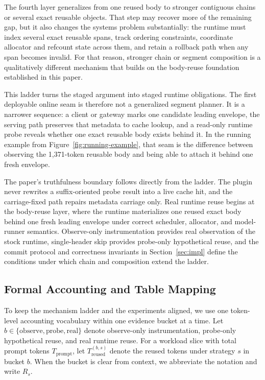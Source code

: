 \documentclass[conference]{IEEEtran}
\begin{document}
The fourth layer generalizes from one reused body to stronger contiguous chains or several exact reusable objects. That step may recover more of the remaining gap, but it also changes the systems problem substantially: the runtime must index several exact reusable spans, track ordering constraints, coordinate allocator and refcount state across them, and retain a rollback path when any span becomes invalid. For that reason, stronger chain or segment composition is a qualitatively different mechanism that builds on the body-reuse foundation established in this paper.

This ladder turns the staged argument into staged runtime obligations. The first deployable online seam is therefore not a generalized segment planner. It is a narrower sequence: a client or gateway marks one candidate leading envelope, the serving path preserves that metadata to cache lookup, and a read-only runtime probe reveals whether one exact reusable body exists behind it. In the running example from Figure~\ref{fig:running-example}, that seam is the difference between observing the 1{,}371-token reusable body and being able to attach it behind one fresh envelope.

The paper's truthfulness boundary follows directly from the ladder. The plugin never rewrites a suffix-oriented probe result into a live cache hit, and the carriage-fixed path repairs metadata carriage only. Real runtime reuse begins at the body-reuse layer, where the runtime materializes one reused exact body behind one fresh leading envelope under correct scheduler, allocator, and model-runner semantics. Observe-only instrumentation provides real observation of the stock runtime, single-header skip provides probe-only hypothetical reuse, and the commit protocol and correctness invariants in Section~\ref{sec:impl} define the conditions under which chain and composition extend the ladder.

\subsection{Formal Accounting and Table Mapping}

To keep the mechanism ladder and the experiments aligned, we use one token-level accounting vocabulary within one evidence bucket at a time. Let $b \in \{\text{observe}, \text{probe}, \text{real}\}$ denote observe-only instrumentation, probe-only hypothetical reuse, and real runtime reuse. For a workload slice with total prompt tokens $T_{\text{prompt}}$, let $T_{\text{reused}}^{(b,s)}$ denote the reused tokens under strategy $s$ in bucket $b$. When the bucket is clear from context, we abbreviate the notation and write $R_s$.
\end{document}
